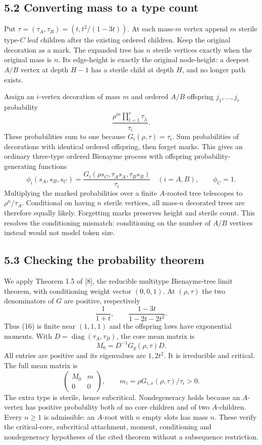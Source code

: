 \documentclass[11pt,letterpaper]{article}
\begin{document}
\subsection{5.2 Converting mass to a type
count}\label{converting-mass-to-a-type-count}

Put \(\tau=(\tau_A,\tau_B)=(t,t^2/(1-3t))\). At each mass-\(m\) vertex
append \(m\) sterile type-\(C\) leaf children after the existing ordered
children. Keep the original decoration as a mark. The expanded tree has
\(n\) sterile vertices exactly when the original mass is \(n\). Its
edge-height is exactly the original node-height: a deepest \(A/B\)
vertex at depth \(H-1\) has a sterile child at depth \(H\), and no
longer path exists.

Assign an \(i\)-vertex decoration of mass \(m\) and ordered \(A/B\)
offspring \(j_1,\ldots,j_r\) probability
\[\frac{\rho^m\prod_{l=1}^r\tau_{j_l}}{\tau_i}.\] These probabilities
sum to one because \(G_i(\rho,\tau)=\tau_i\). Sum probabilities of
decorations with identical ordered offspring, then forget marks. This
gives an ordinary three-type ordered Bienayme process with offspring
probability-generating functions \[
 \phi_i(s_A,s_B,s_C)=\frac{G_i(\rho s_C,\tau_As_A,\tau_Bs_B)}{\tau_i}
 \quad(i=A,B),\qquad \phi_C=1.                               \tag{16}
\] Multiplying the marked probabilities over a finite \(A\)-rooted tree
telescopes to \(\rho^n/\tau_A\). Conditional on having \(n\) sterile
vertices, all mass-\(n\) decorated trees are therefore equally likely.
Forgetting marks preserves height and sterile count. This resolves the
conditioning mismatch: conditioning on the number of \(A/B\) vertices
instead would not model token size.

\subsection{5.3 Checking the probability
theorem}\label{checking-the-probability-theorem}

We apply Theorem 1.5 of {[}8{]}, the reducible multitype Bienayme-tree
limit theorem, with conditioning weight vector \((0,0,1)\). At
\((\rho,\tau)\) the two denominators of \(G\) are positive, respectively
\[\frac1{1+t},\qquad \frac{1-3t}{1-2t-2t^2}.\] Thus (16) is finite near
\((1,1,1)\) and the offspring laws have exponential moments. With
\(D=\operatorname{diag}(\tau_A,\tau_B)\), the core mean matrix is
\[M_0=D^{-1}G_y(\rho,\tau)D.\] All entries are positive and its
eigenvalues are \(1,2t^2\). It is irreducible and critical. The full
mean matrix is \[\begin{pmatrix}M_0&m\\0&0\end{pmatrix},\qquad
 m_i=\rho G_{i,x}(\rho,\tau)/\tau_i>0.\] The extra type is sterile,
hence subcritical. Nondegeneracy holds because an \(A\)-vertex has
positive probability both of no core children and of two \(A\)-children.
Every \(n\ge1\) is admissible: an \(A\)-root with \(n\) empty slots has
mass \(n\). These verify the critical-core, subcritical attachment,
moment, conditioning and nondegeneracy hypotheses of the cited theorem
without a subsequence restriction.
\end{document}
